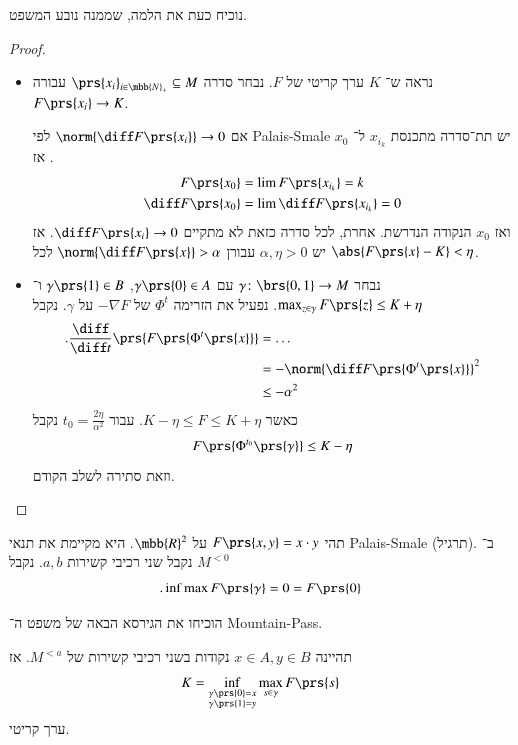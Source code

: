 \documentclass[a4paper,10pt,twoside,openany]{book}
\begin{document}
נוכיח כעת את הלמה, שממנה נובע המשפט.

\begin{proof}
\begin{itemize}
\item נראה ש־%
$K$
ערך קריטי של
$F$.
נבחר סדרה
$\prs{x_i}_{i \in \mbb{N}_+} \subseteq M$
עבורה
$F\prs{x_i} \to K$.

אם
$\norm{\diff F\prs{x_i}} \to 0$
לפי
\textenglish{Palais-Smale}
יש תת־סדרה מתכנסת
$x_{i_k}$
ל־%
$x_0$.
אז
\begin{align*}
F\prs{x_0} &= \lim F\prs{x_{i_k}} = k \\
\diff F\prs{x_0} &= \lim \diff F\prs{x_{i_k}} = 0
\end{align*}
ואז
$x_0$
הנקודה הנדרשת.
אחרת,
לכל סדרה כזאת לא מתקיים
$\diff F\prs{x_i} \to 0$.
אז יש
$\alpha,\eta > 0$
עבורן
$\norm{\diff F\prs{x}} > \alpha$
לכל
$\abs{F\prs{x} - K} < \eta$.

\item נבחר
$\gamma \colon \brs{0,1} \to M$
עם
$\gamma\prs{0} \in A$,
$\gamma\prs{1} \in B$
ו־%
$\max_{z \in \gamma} F\prs{z} \leq K + \eta$.
נפעיל את הזרימה
$\Phi^t$
של
$- \nabla F$
על
$\gamma$.
נקבל
\begin{align*}
\text{.} \frac{\diff}{\diff t} \prs{F\prs{\Phi^t\prs{x}}} &= \ldots
\\&= -\norm{\diff F\prs{\Phi^t\prs{x}}}^2
\\&\leq -\alpha^2
\end{align*}
כאשר
$K - \eta \leq F \leq K + \eta$.
עבור
$t_0 = \frac{2 \eta}{\alpha^2}$
נקבל
\[F\prs{\Phi^{t_0}\prs{\gamma}} \leq K - \eta\]
וזאת סתירה לשלב הקודם.
\end{itemize}
\end{proof}



\begin{example}
תהי
$F\prs{x,y} = x \cdot y$
על
$\mbb{R}^2$.
היא מקיימת את תנאי
\textenglish{Palais-Smale}
(תרגיל).
ב־%
$M^{<0}$
נקבל שני רכיבי קשירות
$a,b$.
נקבל
\[\text{.} \inf \max F\prs{\gamma} = 0 = F\prs{0}\]
\end{example}

\begin{exercise}
הוכיחו את הגירסא הבאה של משפט ה־%
\textenglish{Mountain-Pass}.
\end{exercise}

\begin{theorem}
תהיינה
$x \in A, y \in B$
נקודות בשני רכיבי קשירות של
$M^{< a}$.
אז
\[K = \inf_{\substack{\gamma\prs{0} = x \\ \gamma\prs{1} = y}} \max_{s \in \gamma} F\prs{s}\]
ערך קריטי.
\end{theorem}
\end{document}
